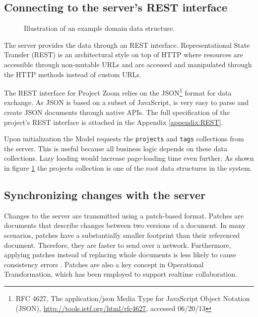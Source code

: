 \subsection{Connecting to the server's REST interface}

\begin{figure}
\caption{Illustration of an example domain data structure.}
\label{fig:projectstruc}
\end{figure}

The server provides the data through an REST interface. Representational State Transfer (REST) is an architectural style on top of HTTP where resources are accessible through non-mutable URLs and are accessed and manipulated through the HTTP methods instead of custom URLs. \cite{Fielding_2000} 

The REST interface for Project Zoom relies on the JSON\footnote{RFC 4627,  The application/json Media Type for JavaScript Object Notation (JSON), \url{http://tools.ietf.org/html/rfc4627}, accessed 06/20/13} format for data exchange. As JSON is based on a subset of JavaScript, is very easy to parse and create JSON documents through native APIs. The full specification of the project's REST interface is attached in the Appendix \ref{appendix:REST}.

Upon initialization the Model requests the \texttt{projects} and \texttt{tags} collections from the server. This is useful because all business logic depends on these data collections. Lazy loading would increase page-loading time even further. As shown in figure \ref{fig:projectstruc} the projects collection is one of the root data structures in the system. %


\subsection{Synchronizing changes with the server}

Changes to the server are transmitted using a patch-based format. Patches are documents that describe changes between two versions of a document. In many scenarios, patches have a substantially smaller footprint than their referenced document. Therefore, they are faster to send over a network. Furthermore, applying patches instead of replacing whole documents is less likely to cause consistency errors \cite{Ellis_1989}. Patches are also a key concept in Operational Transformation, which has been employed to support realtime collaboration.

